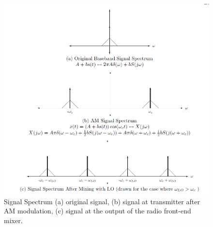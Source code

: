 \documentclass[12pt]{article}
\begin{document}
\begin{figure}[H]
\centering
\includegraphics[scale=0.3]{P6.jpg}
\caption{Signal Spectrum (a) original signal, (b) signal at transmitter after AM modulation, (c) signal
at the output of the radio front-end mixer.}
\end{figure}
\end{document}
